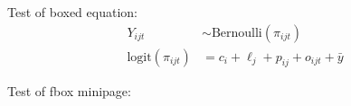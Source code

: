 \documentclass{article}
\begin{document}
Test of boxed equation:
\begin{equation}
\label{eq:test}
\boxed{
\begin{aligned}
Y_{ijt} &\sim \text{Bernoulli}(\pi_{ijt}) \\
\text{logit}(\pi_{ijt}) &= c_i + \ell_j + p_{ij} + o_{ijt} + \bar{y}
\end{aligned}
}
\end{equation}

Test of fbox minipage:
\end{document}
